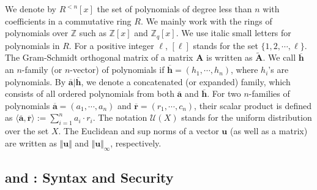 \documentclass[runningheads]{llncs}
\begin{document}
 We denote by $R^{<n}[x]$ the set of polynomials of degree less than $n$ with coefficients in a commutative  ring $R$.
 We mainly work with the rings of polynomials over $\mathbb{Z}$ such as $\mathbb{Z}[x]$
 and $\mathbb{Z}_q[x]$.  We use italic small letters for  polynomials in $R$.
For a positive integer $\ell$, $[\ell]$ stands for the set $\{1, 2, \cdots , \ell\}$. 
The Gram-Schmidt orthogonal matrix of a matrix $\mathbf{A}$ is written as $\tilde{\mathbf{A}}$. 
We call $\overline{\mathbf{h}}$ an $n$-family (or $n$-vector) of polynomials 
if  $\overline{\mathbf{h}}=(h_1,\cdots, h_n)$, where $h_i$'s are polynomials. 
By $\overline{\mathbf{a}}|\overline{\mathbf{h}}$, we denote a concatenated (or expanded) family,
which consists of all ordered  polynomials from both $\overline{\mathbf{a}}$ and $\overline{\mathbf{h}}$. For two $n$-families  of polynomials $ \overline{\textbf{a}}=(a_1, \cdots, a_n)$ and $\overline{\textbf{r}}=(r_1, \cdots, c_n)$,  their scalar product is defined as $\langle \overline{\textbf{a}},\overline{\textbf{r}} \rangle:=\sum_{i=1}^{n}a_i\cdot r_i$. 
 The notation $\mathcal{U}(X)$ stands for the uniform distribution over the set $X$.
The Euclidean and sup norms of a vector $\textbf{u}$ (as well as a matrix) are
written as $\Vert \mathbf{u} \Vert$ and $ \Vert \mathbf{u} \Vert_{\infty}$, respectively.

\subsection{ and : Syntax and Security}
\end{document}
